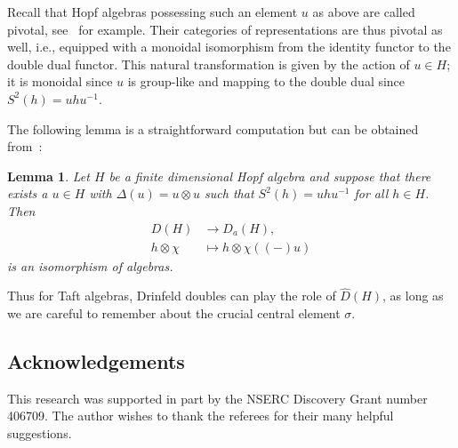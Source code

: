 \documentclass[pdftex]{sigma}
\numberwithin{equation}{section}
\newtheorem{Lemma}[Theorem]{Lemma}
\newcommand{\ot}{\otimes}
\begin{document}
Recall that Hopf algebras possessing such an element $u$ as above are called pivotal, see~\cite{pivot, spherical} for example. Their categories of representations are thus pivotal as well, i.e., equipped with a monoidal isomorphism from the identity functor to the double dual functor. This natural transformation is given by the action of $u\in H$; it is monoidal since $u$ is group-like and mapping to the double dual since $S^2(h)=uhu^{-1}$.

The following lemma is a straightforward computation but can be obtained from~\cite{gentaft}:

\begin{Lemma}\label{uhu}
Let $H$ be a finite dimensional Hopf algebra and suppose that there exists a $u\in H$ with $\Delta(u)=u\ot u$ such that $S^2(h)=uhu^{-1}$ for all $h\in H$. Then
\begin{align*}
D(H)&\to D_a(H),
\\
h\ot \chi&\mapsto h\ot \chi((-)u)
\end{align*} is an isomorphism of algebras.
\end{Lemma}

Thus for Taft algebras, Drinfeld doubles can play the role of $\widehat{D}(H)$, as long as we are careful to remember about the crucial central element $\sigma$.

\subsection*{Acknowledgements}

This research was supported in part by the NSERC Discovery Grant number 406709. The author wishes to thank the referees for their many helpful suggestions.
\end{document}
